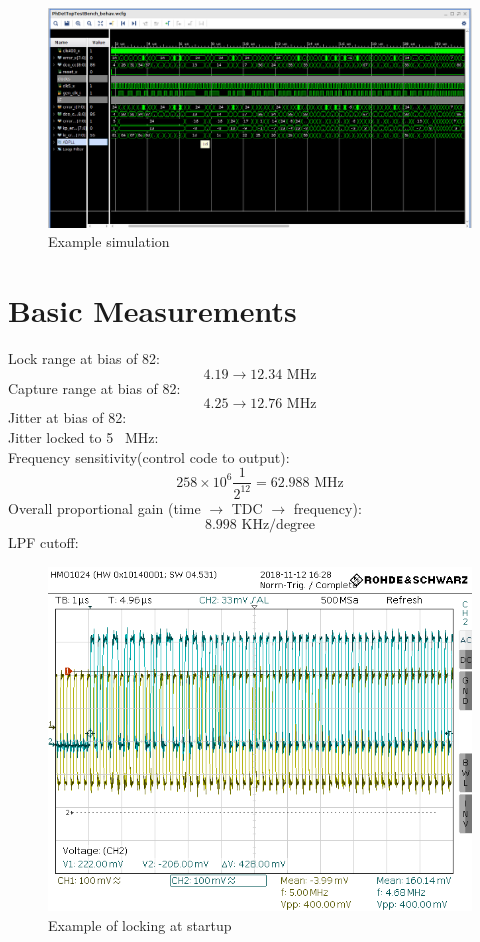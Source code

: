 \documentclass[a4paper,12pt]{report}
\begin{document}
\begin{figure}[h]
    \centering
    \includegraphics[scale=0.33]{../good_sim}
    \caption{Example simulation}
    \label{fig:example_sim}
\end{figure}

\section*{Basic Measurements}
Lock range at bias of 82:
$$4.19\rightarrow12.34\textrm{ MHz} $$ 
Capture range at bias of 82:
$$4.25\rightarrow12.76\textrm{ MHz}  $$
Jitter at bias of 82:\\
Jitter locked to 5~ MHz:\\
Frequency sensitivity(control code to output):
$$ 258\times10^6\frac{1}{2^{12}}=62.988\textrm{ MHz} $$
Overall proportional gain (time $\rightarrow$ TDC $\rightarrow$ frequency):
$$ 8.998 \textrm{ KHz/degree} $$
LPF cutoff:\\

\begin{figure}[h]
    \centering
    \includegraphics[scale=0.33]{../HMO_locking_4M7_to5M0}
    \caption{Example of locking at startup}
    \label{fig:hmo_locking}
\end{figure}%
\end{document}
